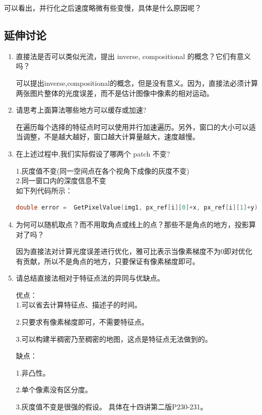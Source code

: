 \documentclass[40pt,a4paper，UTF8]{ctexart}
\numberwithin{equation}{section}
\begin{document}
可以看出，并行化之后速度略微有些变慢，具体是什么原因呢？

\subsection{延伸讨论}
\begin{enumerate}
\item 直接法是否可以类似光流，提出 inverse, compositional 的概念？它们有意义吗？

可以提出inverse,compositional的概念，但是没有意义。因为，直接法必须计算两张图片整体的光度误差，而不是估计图像中像素的相对运动。

\item 请思考上面算法哪些地方可以缓存或加速?

在遍历每个选择的特征点时可以使用并行加速遍历。另外，窗口的大小可以适当调整，不是越大越好，窗口越大计算量越大，速度越慢。

\item 在上述过程中,我们实际假设了哪两个 patch 不变?

1.灰度值不变(同一空间点在各个视角下成像的灰度不变) \\
2.同一窗口内的深度信息不变\\
如下列代码所示：
\begin{lstlisting}[language=C++]
double error =  GetPixelValue(img1, px_ref[i][0]+x, px_ref[i][1]+y) - GetPixelValue(img2, u+x, v+y);
\end{lstlisting}

\item 为何可以随机取点？而不用取角点或线上的点？那些不是角点的地方，投影算对了吗？

因为直接法对计算光度误差进行优化，雅可比表示当像素梯度不为0即对优化有贡献，所以不是角点的地方，只要保证有像素梯度即可。

\item 请总结直接法相对于特征点法的异同与优缺点。

优点： \\
1.可以省去计算特征点、描述子的时间。

2.只要求有像素梯度即可，不需要特征点。

3.可以构建半稠密乃至稠密的地图，这点是特征点无法做到的。

缺点：

1.非凸性。

2.单个像素没有区分度。

3.灰度值不变是很强的假设。
具体在十四讲第二版P230-231。
\end{enumerate}
\end{document}
